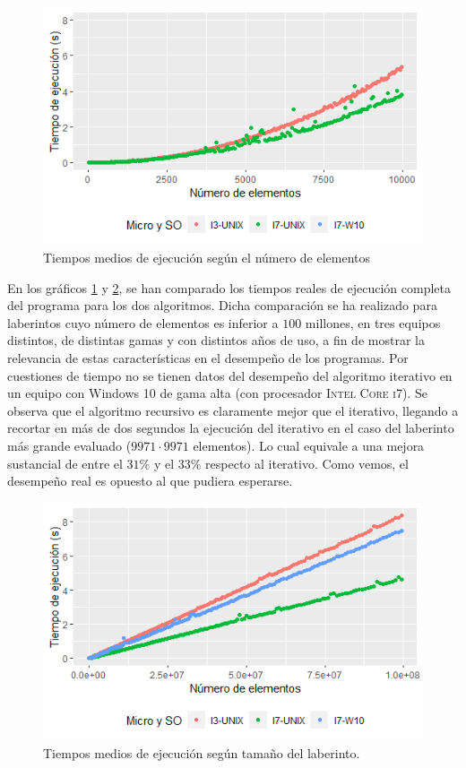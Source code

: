 \documentclass[12pt,a4paper]{article}
\begin{document}
\begin{figure}[h]
	\centering
	\includegraphics[scale=0.9]{fotos/Tiempos_recursivo1.png}
	\caption{Tiempos medios de ejecución según el número de elementos}
	\label{grafico4}
\end{figure}
\vspace{0.2cm}

En los gráficos \ref{grafico4} y \ref{grafico5}, se han comparado los tiempos reales de ejecución completa del programa para los dos algoritmos. Dicha comparación se ha realizado para laberintos cuyo número de elementos es inferior a $100$ millones, en tres equipos distintos, de distintas gamas y con distintos años de uso, a fin de mostrar la relevancia de estas características en el desempeño de los programas. Por cuestiones de tiempo no se tienen datos del desempeño del algoritmo iterativo en un equipo con Windows 10 de gama alta (con procesador \textsc{Intel Core i7}). Se observa que el algoritmo recursivo es claramente mejor que el iterativo, llegando a recortar en más de dos segundos la ejecución del iterativo en el caso del laberinto más grande evaluado ($9971\cdot9971$ elementos). Lo cual equivale a una mejora sustancial de entre el $31\%$ y el $33\%$ respecto al iterativo. Como vemos, el desempeño real es opuesto al que pudiera esperarse. 

\vspace{0.2cm}

\begin{figure}[H]
	\centering
	\includegraphics[scale=0.9]{fotos/Tiempos_Iterativo1.png}
	\caption{Tiempos medios de ejecución según tamaño del laberinto. }
	\label{grafico5}
\end{figure}
\vspace{0.2cm}
\end{document}
